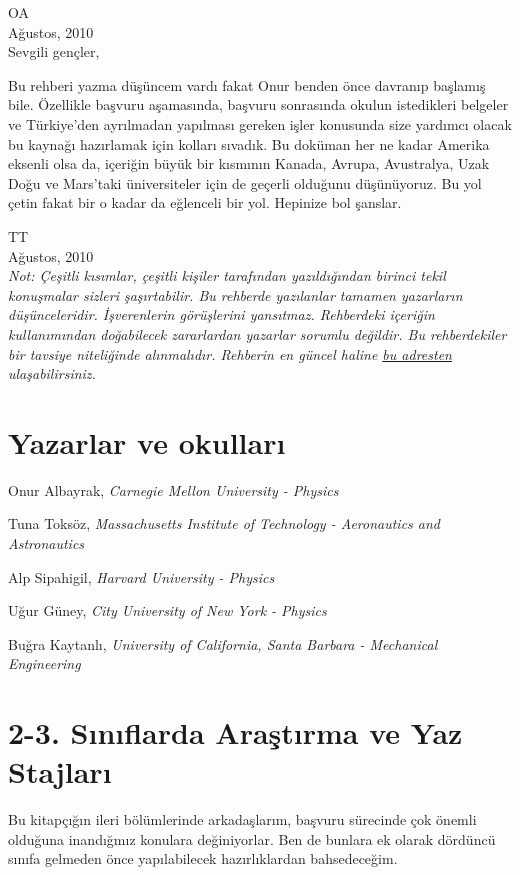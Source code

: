 \documentclass[12pt,a4paper]{article}
\begin{document}
\noindent OA \\
Ağustos, 2010 \\

\noindent Sevgili gençler, 

Bu rehberi yazma düşüncem vardı fakat Onur benden önce davranıp başlamış bile. Özellikle başvuru aşamasında, başvuru sonrasında okulun istedikleri belgeler ve Türkiye'den ayrılmadan yapılması gereken işler konusunda size yardımcı olacak bu kaynağı hazırlamak için kolları sıvadık. Bu doküman her ne kadar Amerika eksenli olsa da, içeriğin büyük bir kısmının Kanada, Avrupa, Avustralya, Uzak Doğu ve Mars'taki üniversiteler için de geçerli olduğunu düşünüyoruz. Bu yol çetin fakat bir o kadar da eğlenceli bir yol. Hepinize bol şanslar.   

\noindent TT \\
Ağustos, 2010 \\

\textit{Not: Çeşitli kısımlar, çeşitli kişiler tarafından yazıldığından birinci tekil konuşmalar sizleri şaşırtabilir. Bu rehberde yazılanlar tamamen yazarların düşünce\-leridir. İşverenlerin görüşlerini yansıtmaz. Rehberdeki içeriğin kullanımından doğabilecek zararlardan yazarlar sorumlu değildir. Bu rehberdekiler bir tavsiye niteliğinde alınmalıdır.
Rehberin en güncel haline \href{https://github.com/yurtdisiphdrehberi/yurtdisiphdrehberi/}{bu adresten} ulaşabilirsiniz.}

\newpage
%
%
%
\section*{Yazarlar ve okulları}

Onur Albayrak, \textit{Carnegie Mellon University - Physics }

Tuna Toksöz, \textit{Massachusetts Institute of Technology - Aeronautics and Astronautics }

Alp Sipahigil, \textit{Harvard University - Physics }

Uğur Güney, \textit{City University of New York - Physics }

Buğra Kaytanlı, \textit{University of California, Santa Barbara - Mechanical Engineering}
\newpage
%
%
\section{2-3. Sınıflarda Araştırma ve Yaz Stajları}
Bu kitapçığın ileri bölümlerinde arkadaşlarım, başvuru sürecinde çok önemli olduğuna inandığmız konulara değiniyorlar. Ben de bunlara ek olarak dördün\-cü sınıfa gelmeden önce yapılabilecek hazırlıklardan bahsedeceğim.
\end{document}
